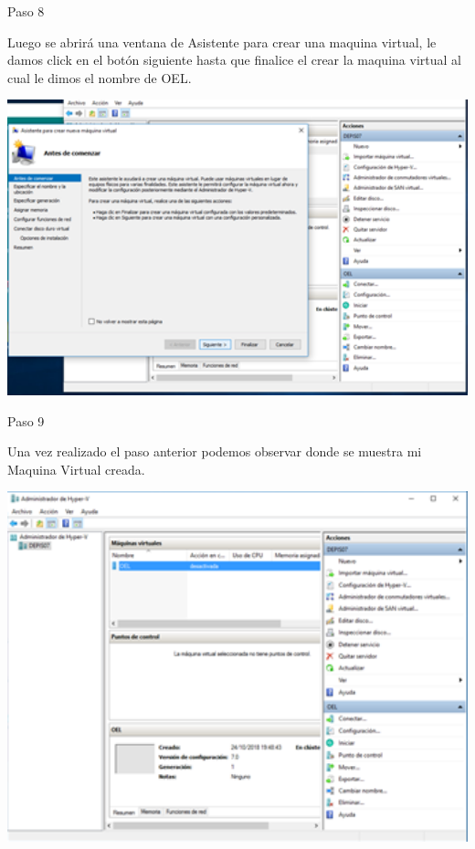\begin{itemize}
\begin{center}
    Paso 8
\end{center}


    Luego se abrirá una ventana de Asistente para crear una maquina virtual, le damos click en el botón siguiente hasta que finalice el crear la maquina virtual al cual le dimos el nombre de OEL.\\
	\begin{center}
	\includegraphics[width=15cm]{./Imagenes/imagen8} 
	\end{center}


\end{itemize} 

\begin{itemize}
\begin{center}
    Paso 9
\end{center}


    Una vez realizado el paso anterior podemos observar donde se muestra mi Maquina Virtual creada.\\
	\begin{center}
	\includegraphics[width=15cm]{./Imagenes/imagen9} 
	\end{center}

\end{itemize} 

